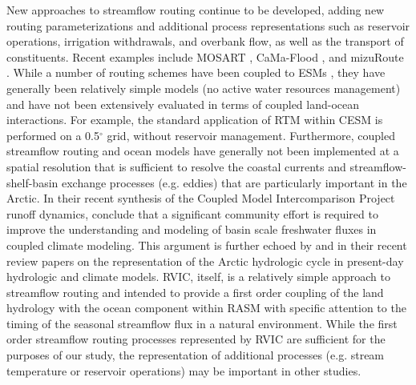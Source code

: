 \documentclass[jgrga, draft]{agutex}
\begin{document}
\begin{article}
New approaches to streamflow routing continue to be developed, adding new routing parameterizations and additional process representations such as reservoir operations, irrigation withdrawals, and overbank flow, as well as the transport of constituents.
Recent examples include MOSART \citep{Li_2013}, CaMa-Flood \citep{Yamazaki_2009,Yamazaki_2014}, and mizuRoute \citep{Clark_2016}.
While a number of routing schemes have been coupled to ESMs \citep[e.g.][]{Olivera_2000,Sushama_2004}, they have generally been relatively simple models (no active water resources management) and have not been extensively evaluated in terms of coupled land-ocean interactions.
For example, the standard application of RTM within CESM is performed on a 0.5$^{\circ}$ grid, without reservoir management.
Furthermore, coupled streamflow routing and ocean models have generally not been implemented at a spatial resolution that is sufficient to resolve the coastal currents and streamflow-shelf-basin exchange processes (e.g. eddies) that are particularly important in the Arctic.
In their recent synthesis of the Coupled Model Intercomparison Project \citep[CMIP5; ][]{Taylor_2012} runoff dynamics, \citet{Bring_2015} conclude that a significant community effort is required to improve the understanding and modeling of basin scale freshwater fluxes in coupled climate modeling.
This argument is further echoed by \citet{Lique_2015} and \citet{Bring_2016} in their recent review papers on the representation of the Arctic hydrologic cycle in present-day hydrologic and climate models.
RVIC, itself, is a relatively simple approach to streamflow routing and intended to provide a first order coupling of the land hydrology with the ocean component within RASM with specific attention to the timing of the seasonal streamflow flux in a natural environment.
While the first order streamflow routing processes represented by RVIC are sufficient for the purposes of our study, the representation of additional processes (e.g. stream temperature or reservoir operations) may be important in other studies.


\end{article}
\end{document}
